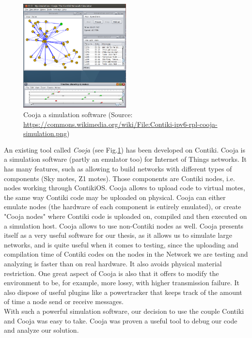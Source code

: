 \begin{figure}
  \centering
  \includegraphics[width=0.5\textwidth]{res/cooja.png}
  \caption{Cooja a simulation software (Source: \url{https://commons.wikimedia.org/wiki/File:Contiki-ipv6-rpl-cooja-simulation.png})}
  \label{fig:cooja}
\end{figure}

An existing tool called \textit{Cooja} (see Fig.\ref{fig:cooja}) has been developed on Contiki. Cooja is a simulation software (partly an emulator too) for Internet of Things networks. It has many features, such as allowing to build networks with different types of components (Sky motes, Z1 motes). Those components are Contiki nodes, i.e. nodes working through ContikiOS. Cooja allows to upload code to virtual motes, the same way Contiki code may be uploaded on physical. Cooja can either emulate nodes (the hardware of each component is entirely emulated), or create "Cooja nodes" where Contiki code is uploaded on, compiled and then executed on a simulation host. Cooja allows to use non-Contiki nodes as well. Cooja presents itself as a very useful software for our thesis, as it allows us to simulate large networks, and is quite useful when it comes to testing, since the uploading and compilation time of Contiki codes on the nodes in the Network we are testing and analyzing is faster than on real hardware. It also avoids physical material restriction. One great aspect of Cooja is also that it offers to modify the environment to be, for example, more lossy, with higher transmission failure. It also dispose of useful plugins like a powertracker that keeps track of the amount of time a node send or receive messages.\\

With such a powerful simulation software, our decision to use the couple Contiki and Cooja was easy to take. Cooja was proven a useful tool to debug our code and analyze our solution.

